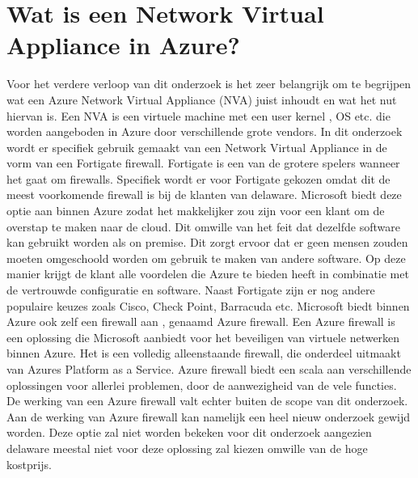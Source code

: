 \newpage
\section{Wat is een Network Virtual Appliance in Azure?}
Voor het verdere verloop van dit onderzoek is het zeer belangrijk om te begrijpen wat een Azure Network Virtual Appliance (NVA) juist inhoudt en wat het nut hiervan is. Een NVA is een virtuele machine met een user kernel , OS etc. die worden aangeboden in Azure door verschillende grote vendors. In dit onderzoek wordt er specifiek gebruik gemaakt van een Network Virtual Appliance in de vorm van een Fortigate firewall. Fortigate is een van de grotere spelers wanneer het gaat om firewalls. Specifiek wordt er voor Fortigate gekozen omdat dit de meest voorkomende firewall is bij de klanten van delaware. Microsoft biedt deze optie aan binnen Azure zodat het makkelijker zou zijn voor een klant om de overstap te maken naar de cloud. Dit omwille van het feit dat dezelfde software kan gebruikt worden als on premise. Dit zorgt ervoor dat er geen mensen zouden moeten omgeschoold worden om gebruik te maken van andere software. Op deze manier krijgt de klant alle voordelen die Azure te bieden heeft in combinatie met de vertrouwde configuratie en software. Naast Fortigate zijn er nog andere populaire keuzes zoals Cisco, Check Point, Barracuda etc. \autocite{MicrosoftNVA} 
Microsoft biedt binnen Azure ook zelf een firewall aan , genaamd Azure firewall. Een Azure firewall is een oplossing die Microsoft aanbiedt voor het beveiligen van virtuele netwerken binnen Azure. \autocite{Cooke} Het is een volledig alleenstaande firewall, die onderdeel uitmaakt van Azures Platform as a Service. \newline \autocite{Seferlis2018} Azure firewall biedt een scala aan verschillende oplossingen voor allerlei problemen, door de aanwezigheid van de vele functies. De werking van een Azure firewall valt echter buiten de scope van dit onderzoek. Aan de werking van Azure firewall kan namelijk een heel nieuw onderzoek gewijd worden. Deze optie zal niet worden bekeken voor dit onderzoek aangezien delaware meestal niet voor deze oplossing zal kiezen omwille van de hoge kostprijs. 

